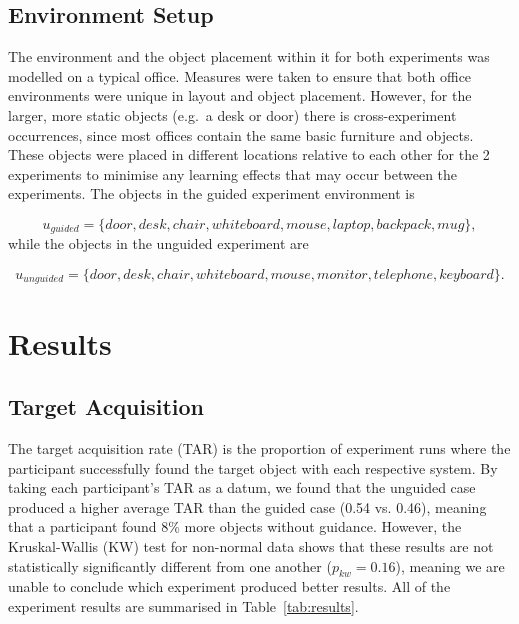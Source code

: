 \documentclass[runningheads]{llncs}
\begin{document}
\subsection{Environment Setup}

The environment and the object placement within it for both experiments was modelled on a typical office.
Measures were taken to ensure that both office environments were unique in layout and object placement. 
However, for the larger, more static objects (e.g.\ a desk or door) there is cross-experiment occurrences, since most offices contain the same basic furniture and objects. 
These objects were placed in different locations relative to each other for the 2 experiments to minimise any learning effects that may occur between the experiments. 
The objects in the guided experiment environment is

\begin{equation*}
  u_{guided} = \{ door, desk, chair, whiteboard, mouse, laptop, backpack, mug \},
\end{equation*}
while the objects in the unguided experiment are

\begin{equation*}
  u_{unguided} = \{ door, desk, chair, whiteboard, mouse, monitor, telephone, keyboard \}.
\end{equation*}


\section{Results}\label{sec:results}

\subsection{Target Acquisition}


The target acquisition rate (TAR) is the proportion of experiment runs where the participant successfully found the target object with each respective system. 
By taking each participant's TAR as a datum, we found that the unguided case produced a higher average TAR than the guided case (0.54 vs. 0.46), meaning that a participant found 8\% more objects without guidance.
However, the Kruskal-Wallis (KW) test for non-normal data shows that these results are not statistically significantly different from one another ($p_{kw} = 0.16$), meaning we are unable to conclude which experiment produced better results. 
All of the experiment results are summarised in Table~\ref{tab:results}. 
\end{document}
